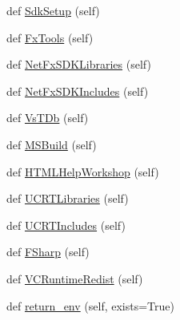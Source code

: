 \begin{DoxyCompactItemize}
\item 
def \hyperlink{classsetuptools_1_1msvc_1_1_environment_info_a23279a1ba0a25df393ca46bbf6385936}{Sdk\+Setup} (self)
\item 
def \hyperlink{classsetuptools_1_1msvc_1_1_environment_info_ae4038292b85b81482ab5bfb95c2dd592}{Fx\+Tools} (self)
\item 
def \hyperlink{classsetuptools_1_1msvc_1_1_environment_info_a77f053b74ebe8fb0a3665de920a6243f}{Net\+Fx\+S\+D\+K\+Libraries} (self)
\item 
def \hyperlink{classsetuptools_1_1msvc_1_1_environment_info_ab13ca2d11d800439d2455f73d4a72c2e}{Net\+Fx\+S\+D\+K\+Includes} (self)
\item 
def \hyperlink{classsetuptools_1_1msvc_1_1_environment_info_a028eec8868bc5260636919e7765abe0b}{Vs\+T\+Db} (self)
\item 
def \hyperlink{classsetuptools_1_1msvc_1_1_environment_info_a755a19d899509a948701311bcdd6a705}{M\+S\+Build} (self)
\item 
def \hyperlink{classsetuptools_1_1msvc_1_1_environment_info_a30dfd7226487fa81a4e40f3824f67d63}{H\+T\+M\+L\+Help\+Workshop} (self)
\item 
def \hyperlink{classsetuptools_1_1msvc_1_1_environment_info_ad99df919a8c42c34654259bf96816981}{U\+C\+R\+T\+Libraries} (self)
\item 
def \hyperlink{classsetuptools_1_1msvc_1_1_environment_info_ae8cddbeb1c6a6d60edc6e46104ef30d0}{U\+C\+R\+T\+Includes} (self)
\item 
def \hyperlink{classsetuptools_1_1msvc_1_1_environment_info_a95f7df78e6bc6122e224e05888e98292}{F\+Sharp} (self)
\item 
def \hyperlink{classsetuptools_1_1msvc_1_1_environment_info_a2ad0b92bc587a134b6eddb0b970df495}{V\+C\+Runtime\+Redist} (self)
\item 
def \hyperlink{classsetuptools_1_1msvc_1_1_environment_info_ae97fea563dbce172645b20d5d151ef1a}{return\+\_\+env} (self, exists=True)
\end{DoxyCompactItemize}
